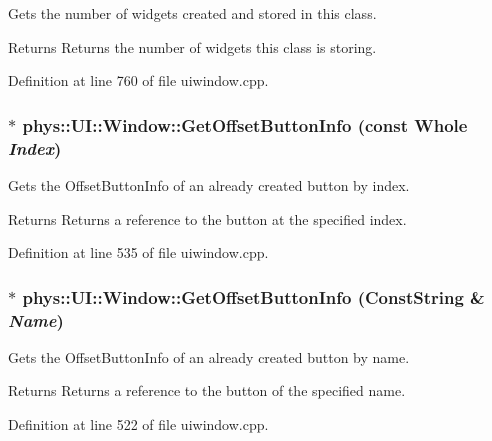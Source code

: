 Gets the number of widgets created and stored in this class. 

\begin{DoxyReturn}{Returns}
Returns the number of widgets this class is storing. 
\end{DoxyReturn}


Definition at line 760 of file uiwindow.cpp.

\hypertarget{classphys_1_1UI_1_1Window_a2f940826aae5071b60a31beeb9fd0f27}{
\subsubsection[{GetOffsetButtonInfo}]{ $\ast$ phys::UI::Window::GetOffsetButtonInfo (const {\bf Whole} {\em Index})}}
\label{d4/d86/classphys_1_1UI_1_1Window_a2f940826aae5071b60a31beeb9fd0f27}


Gets the OffsetButtonInfo of an already created button by index. 

\begin{DoxyReturn}{Returns}
Returns a reference to the button at the specified index. 
\end{DoxyReturn}


Definition at line 535 of file uiwindow.cpp.

\hypertarget{classphys_1_1UI_1_1Window_ad0d6b12c2f69ea1bc580bba7e69949a5}{
\subsubsection[{GetOffsetButtonInfo}]{ $\ast$ phys::UI::Window::GetOffsetButtonInfo ({\bf ConstString} \& {\em Name})}}
\label{d4/d86/classphys_1_1UI_1_1Window_ad0d6b12c2f69ea1bc580bba7e69949a5}


Gets the OffsetButtonInfo of an already created button by name. 

\begin{DoxyReturn}{Returns}
Returns a reference to the button of the specified name. 
\end{DoxyReturn}


Definition at line 522 of file uiwindow.cpp.

